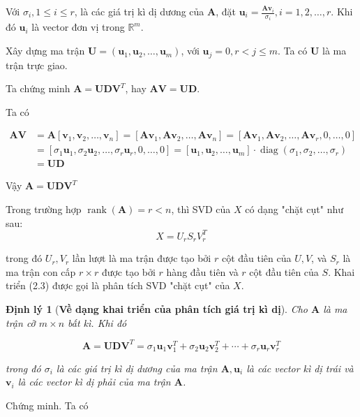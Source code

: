 \documentclass[12pt,a4paper,oneside]{report}
\newtheorem{dl}{Định lý}[section]
\numberwithin{equation}{section}
\begin{document}
Với $\sigma_{i}, 1 \leqslant i \leqslant r$, là các giá trị kì dị dương của $\mathbf{A}$, đặt $\mathbf{u}_{i}=\frac{\mathbf{A v}_{i}}{\sigma_{i}}, i=1,2, \ldots, r$. Khi đó $\mathbf{u}_{i}$ là vector đơn vị trong $\mathbb{R}^{m}$.

Xây dựng ma trận $\mathbf{U}=\left(\mathbf{u}_{1}, \mathbf{u}_{2}, \ldots, \mathbf{u}_{m}\right)$, với $\mathbf{u}_{j}=0, r<j \leqslant m$. Ta có $\mathbf{U}$ là ma trận trực giao.

Ta chứng minh $\mathbf{A}=\mathbf{U D V}^{T}$, hay $\mathbf{A V}=\mathbf{U D}$.

Ta có

$$
\begin{aligned}
	\mathbf{A} \mathbf{V} & =\mathbf{A}\left[\mathbf{v}_{1}, \mathbf{v}_{2}, \ldots, \mathbf{v}_{n}\right]=\left[\mathbf{A v}_{1}, \mathbf{A v}_{2}, \ldots, \mathbf{A} \mathbf{v}_{n}\right]=\left[\mathbf{A v}_{1}, \mathbf{A v}_{2}, \ldots, \mathbf{A v}_{r}, 0, \ldots, 0\right] \\
	& =\left[\sigma_{1} \mathbf{u}_{1}, \sigma_{2} \mathbf{u}_{2}, \ldots, \sigma_{r} \mathbf{u}_{r}, 0, \ldots, 0\right]=\left[\mathbf{u}_{1}, \mathbf{u}_{2}, \ldots, \mathbf{u}_{m}\right] \cdot \operatorname{diag}\left(\sigma_{1}, \sigma_{2}, \ldots, \sigma_{r}\right) \\
	& =\mathbf{U D}
\end{aligned}
$$

Vậy $\mathbf{A}=\mathbf{U D V}^{T}$%

Trong trường hợp $\operatorname{rank}(\mathbf{A})=r<n$, thì SVD của $X$ có dạng "chặt cụt" như sau:
$$
X=U_r S_r V_r^T
$$

trong đó $U_r, V_r$ lần lượt là ma trận được tạo bởi $r$ cột đầu tiên của $U, V$, và $S_r$ là ma trận con cấp $r \times r$ được tạo bởi $r$ hàng đầu tiên và $r$ cột đầu tiên của $S$. Khai triển
(2.3) được gọi là phân tích SVD "chặt cụt" của $X$.


\begin{dl}[\textbf{Về dạng khai triển của phân tích giá trị kì dị}] Cho $\mathbf{A}$ là ma trận cỡ $m \times n$ bất kì. Khi đó

$$
\mathbf{A}=\mathbf{U D V}^{T}=\sigma_{1} \mathbf{u}_{1} \mathbf{v}_{1}^{T}+\sigma_{2} \mathbf{u}_{2} \mathbf{v}_{2}^{T}+\cdots+\sigma_{r} \mathbf{u}_{r} \mathbf{v}_{r}^{T}
$$

trong đó $\sigma_{i}$ là các giá trị kì dị dương của ma trận $\mathbf{A}, \mathbf{u}_{i}$ là các vector kì dị trái và $\mathbf{v}_{i}$ là các vector kì dị phải của ma trận $\mathbf{A}$.
\end{dl}
Chứng minh. Ta có
\end{document}
